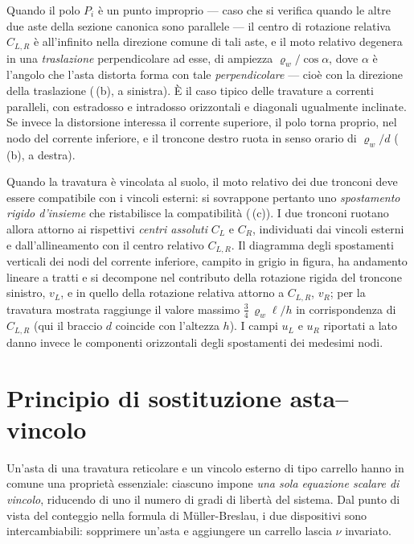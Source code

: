 Quando il polo $P_i$ è un punto improprio --- caso che si verifica
quando le altre due aste della sezione canonica sono parallele --- il
centro di rotazione relativa $C_{L,R}$ è all'infinito nella direzione
comune di tali aste, e il moto relativo degenera in una
\emph{traslazione} perpendicolare ad esse, di ampiezza
$\varrho_w/\cos\alpha$, dove $\alpha$ è l'angolo che l'asta distorta
forma con tale \emph{perpendicolare} --- cioè con la direzione della
traslazione (\,(b), a sinistra). È il caso tipico delle
travature a correnti paralleli, con estradosso e intradosso orizzontali
e diagonali ugualmente inclinate. Se invece la distorsione interessa il
corrente superiore, il polo torna proprio, nel nodo del corrente
inferiore, e il troncone destro ruota in senso orario di $\varrho_w/d$
(\,(b), a destra).

Quando la travatura è vincolata al suolo, il moto relativo dei due
tronconi deve essere compatibile con i vincoli esterni: si sovrappone
pertanto uno \emph{spostamento rigido d'insieme} che ristabilisce la
compatibilità (\,(c)). I due tronconi ruotano
allora attorno ai rispettivi \emph{centri assoluti} $C_L$ e $C_R$,
individuati dai vincoli esterni e dall'allineamento con il centro
relativo $C_{L,R}$. Il diagramma degli spostamenti verticali dei nodi
del corrente inferiore, campito in grigio in figura, ha andamento
lineare a tratti e si decompone nel contributo della rotazione rigida
del troncone sinistro, $v_L$, e in quello della rotazione relativa
attorno a $C_{L,R}$, $v_R$; per la travatura mostrata raggiunge il
valore massimo $\tfrac{3}{4}\,\varrho_w\ell/h$ in corrispondenza di
$C_{L,R}$ (qui il braccio $d$ coincide con l'altezza $h$). I campi
$u_L$ e  $u_R$ riportati a lato danno invece le componenti orizzontali degli spostamenti dei medesimi nodi.






\section{Principio di sostituzione asta--vincolo}
\label{sec:sostituzione_reticolari}

Un'asta di una travatura reticolare e un vincolo
esterno di tipo carrello hanno in comune una proprietà
essenziale: ciascuno impone \emph{una sola equazione
	scalare di vincolo}, riducendo di uno il numero di
gradi di libertà del sistema. Dal punto di vista del
conteggio nella formula di M\"{u}ller-Breslau, i due
dispositivi sono intercambiabili: sopprimere un'asta
e aggiungere un carrello lascia $\nu$ invariato.

